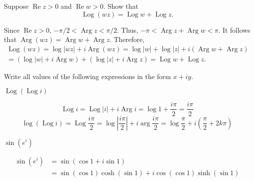 \documentclass[answers, 12pt]{exam}
\renewcommand{\Re}{\operatorname{Re}}
\DeclareMathOperator{\Log}{Log}
\DeclareMathOperator{\Arg}{Arg}
\begin{document}
\begin{questions}

\question
Suppose $\Re z>0$ and $\Re w>0$. Show that
\[
    \Log(wz) = \Log w + \Log z.
\]
\begin{solution}
    Since $\Re z>0$, $-\pi/2<\Arg z< \pi/2$. Thus, $-\pi < \Arg z + \Arg w< \pi$. It follows that
    $\Arg(wz) = \Arg w + \Arg z$. Therefore,
    \begin{multline*}
        \Log(wz) = \log |wz| + i \Arg(wz) = \log|w| + \log |z| + i(\Arg w + \Arg z)\\
        = (\log|w| + i\Arg w )+ (\log |z| + i\Arg z) = \Log w + \Log z.
    \end{multline*}
\end{solution}







\question Write all values of the following expressions in the form $x+iy$.
\begin{parts}
    \item $\Log(\Log i)$
    \begin{solution}
        \[
            \Log i = \Log |i| + i\Arg i = \log 1 + \frac{i\pi}2
            = \frac{i\pi}2
        \]
        \[
            \log(\Log i) = \Log\frac{i\pi}2 = \log\left|\frac{i\pi}2\right| + i\arg\frac{i\pi}2
            = \log\frac\pi 2 + i\left(\frac{\pi}2+2k\pi\right)
        \]
    \end{solution}

    \item $\sin(e^i)$
    \begin{solution}
        \begin{align*}
            \sin(e^i) &= \sin(\cos 1 + i\sin 1)\\ &= \sin(\cos 1)\cosh(\sin 1) + i\cos(\cos 1)\sinh(\sin 1)
        \end{align*}
    \end{solution}


\end{parts}
\end{questions}
\end{document}
